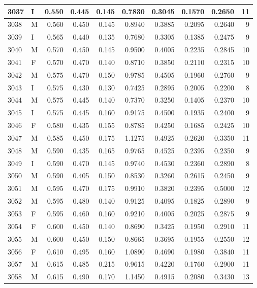 \documentclass[9pt,twocolumn,twoside,]{pnas-new}
\begin{document}
\begin{tabular}{l|l|r|r|r|r|r|r|r|r}
\hline
3037 & I & 0.550 & 0.445 & 0.145 & 0.7830 & 0.3045 & 0.1570 & 0.2650 & 11\\
\hline
3038 & M & 0.560 & 0.450 & 0.145 & 0.8940 & 0.3885 & 0.2095 & 0.2640 & 9\\
\hline
3039 & I & 0.565 & 0.440 & 0.135 & 0.7680 & 0.3305 & 0.1385 & 0.2475 & 9\\
\hline
3040 & M & 0.570 & 0.450 & 0.145 & 0.9500 & 0.4005 & 0.2235 & 0.2845 & 10\\
\hline
3041 & F & 0.570 & 0.470 & 0.140 & 0.8710 & 0.3850 & 0.2110 & 0.2315 & 10\\
\hline
3042 & M & 0.575 & 0.470 & 0.150 & 0.9785 & 0.4505 & 0.1960 & 0.2760 & 9\\
\hline
3043 & I & 0.575 & 0.430 & 0.130 & 0.7425 & 0.2895 & 0.2005 & 0.2200 & 8\\
\hline
3044 & M & 0.575 & 0.445 & 0.140 & 0.7370 & 0.3250 & 0.1405 & 0.2370 & 10\\
\hline
3045 & I & 0.575 & 0.445 & 0.160 & 0.9175 & 0.4500 & 0.1935 & 0.2400 & 9\\
\hline
3046 & F & 0.580 & 0.435 & 0.155 & 0.8785 & 0.4250 & 0.1685 & 0.2425 & 10\\
\hline
3047 & M & 0.585 & 0.450 & 0.175 & 1.1275 & 0.4925 & 0.2620 & 0.3350 & 11\\
\hline
3048 & M & 0.590 & 0.435 & 0.165 & 0.9765 & 0.4525 & 0.2395 & 0.2350 & 9\\
\hline
3049 & I & 0.590 & 0.470 & 0.145 & 0.9740 & 0.4530 & 0.2360 & 0.2890 & 8\\
\hline
3050 & M & 0.590 & 0.405 & 0.150 & 0.8530 & 0.3260 & 0.2615 & 0.2450 & 9\\
\hline
3051 & M & 0.595 & 0.470 & 0.175 & 0.9910 & 0.3820 & 0.2395 & 0.5000 & 12\\
\hline
3052 & M & 0.595 & 0.480 & 0.140 & 0.9125 & 0.4095 & 0.1825 & 0.2890 & 9\\
\hline
3053 & F & 0.595 & 0.460 & 0.160 & 0.9210 & 0.4005 & 0.2025 & 0.2875 & 9\\
\hline
3054 & F & 0.600 & 0.450 & 0.140 & 0.8690 & 0.3425 & 0.1950 & 0.2910 & 11\\
\hline
3055 & M & 0.600 & 0.450 & 0.150 & 0.8665 & 0.3695 & 0.1955 & 0.2550 & 12\\
\hline
3056 & F & 0.610 & 0.495 & 0.160 & 1.0890 & 0.4690 & 0.1980 & 0.3840 & 11\\
\hline
3057 & M & 0.615 & 0.485 & 0.215 & 0.9615 & 0.4220 & 0.1760 & 0.2900 & 11\\
\hline
3058 & M & 0.615 & 0.490 & 0.170 & 1.1450 & 0.4915 & 0.2080 & 0.3430 & 13\\

\end{tabular}
\end{document}
